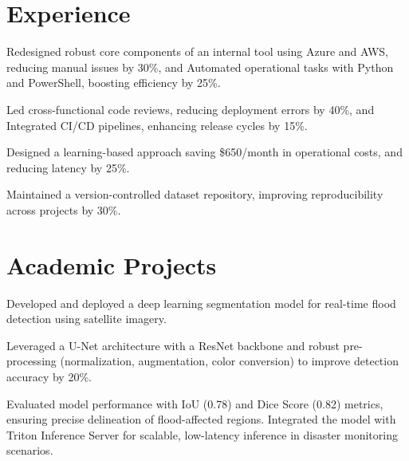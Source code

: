 \documentclass[]{deedy-resume-openfont}
\begin{document}
\begin{minipage}[t]{0.33\textwidth}
%
%

\end{minipage} 
\hfill
\begin{minipage}[t]{0.66\textwidth} 


\section{Experience}
\vspace{\topsep} %
\begin{tightemize}
\item Redesigned robust core components of an internal tool using Azure and AWS, reducing manual issues by 30\%, and Automated operational tasks
with Python and PowerShell, boosting efficiency by 25\%.
\item Led cross-functional code reviews, reducing deployment errors by 40\%, and Integrated CI/CD pipelines, enhancing release
cycles by 15\%.
\end{tightemize}
\sectionsep

\begin{tightemize}
\item Designed a learning-based approach saving \$650/month in operational costs, and reducing latency by 25\%.
\item Maintained a version-controlled dataset repository, improving reproducibility across projects by 30\%.

\end{tightemize}
\sectionsep


\section{Academic Projects}

\begin{tightemize}
\item Developed and deployed a deep learning segmentation model for real-time flood detection using satellite imagery.
\item Leveraged a U-Net architecture with a ResNet backbone and robust pre-processing (normalization, augmentation, color conversion) to improve detection accuracy by 20\%.
\item Evaluated model performance with IoU (0.78) and Dice Score (0.82) metrics, ensuring precise delineation of flood-affected regions. Integrated the model with Triton Inference Server for scalable, low-latency inference in disaster monitoring scenarios.


\end{tightemize}
\end{minipage}
\end{document}
